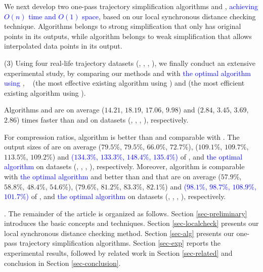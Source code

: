  We next develop two one-pass trajectory simplification algorithms \cist and \cista, \textcolor{blue}{achieving $O(n)$ time and $O(1)$ space}, based on our local synchronous distance checking technique. 
Algorithms \cist belongs to strong simplification that only has original points in its outputs, while algorithm \cista belongs to weak simplification that allows interpolated data points in its output.


\sstab (3) Using four real-life trajectory datasets (\truck, \sercar, \geolife, \pricar),
we finally conduct an extensive experimental study, by comparing our methods \cist and \cista  with \textcolor{blue}{the optimal \lsa algorithm using \sed}, \dps~\cite{Meratnia:Spatiotemporal} (the most effective existing \lsa algorithm using \sed) and \squishe \cite{Muckell:Compression} (the most efficient existing \lsa algorithm using \sed).

Algorithms \cist and \cista are on average ($14.21$, $18.19$, $17.06$, $9.98$) and ($2.84$, $3.45$, $3.69$, $2.86$) times faster than \dps and \squishe on datasets (\sercar, \geolife, \mopsi, \pricar), respectively.

For compression ratios, algorithm \cist is better than \squishe and comparable with \dps. The output sizes of \cist are on average ($79.5\%$, $79.5\%$, $66.0\%$, $72.7\%$),
($109.1\%$, $109.7\%$, $113.5\%$, $109.2\%$) and \textcolor{blue}{($134.3\%$, $133.3\%$,
  $148.4\%$, $135.4\%$)} of \squishe, \dps and \textcolor{blue}{the optimal \lsa algorithm} on datasets (\sercar, \geolife, \mopsi, \pricar), respectively. 
Moreover, algorithm \cista is comparable with \textcolor{blue}{the optimal \lsa algorithm} and better than \squishe and \dps that are on average ($57.9\%$, $58.8\%$, $48.4\%$, $54.6\%$),
($79.6\%$, $81.2\%$, $83.3\%$, $82.1\%$) and \textcolor{blue}{($98.1\%$, $98.7\%$, $108.9\%$,
  $101.7\%$)} of \squishe, \dps and \textcolor{blue}{the optimal \lsa algorithm} on datasets (\sercar, \geolife, \mopsi, \pricar), respectively.


.
The remainder of the article is organized as follows.
Section \ref{sec-preliminary} introduces the basic concepts and techniques.
Section \ref{sec-localcheck} presents our local synchronous distance checking method.
Section \ref{sec-alg} presents our one-pass trajectory simplification algorithms.
Section \ref{sec-exp} reports the experimental results, followed by related work in
Section \ref{sec-related} and conclusion in Section \ref{sec-conclusion}.





